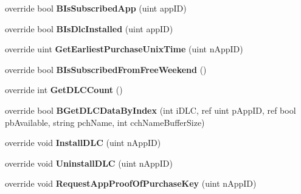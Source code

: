 \begin{DoxyCompactItemize}
override bool {\bfseries B\+Is\+Subscribed\+App} (uint app\+ID)
\item 
\mbox{\label{class_valve_1_1_steamworks_1_1_c_steam_apps_af059435f5861d3e39b48dd1df92a7dae}} 
override bool {\bfseries B\+Is\+Dlc\+Installed} (uint app\+ID)
\item 
\mbox{\label{class_valve_1_1_steamworks_1_1_c_steam_apps_aab74611945daf6679d917c1252a4f79c}} 
override uint {\bfseries Get\+Earliest\+Purchase\+Unix\+Time} (uint n\+App\+ID)
\item 
\mbox{\label{class_valve_1_1_steamworks_1_1_c_steam_apps_ab711fe1a3403481fd90bb4f454ececd7}} 
override bool {\bfseries B\+Is\+Subscribed\+From\+Free\+Weekend} ()
\item 
\mbox{\label{class_valve_1_1_steamworks_1_1_c_steam_apps_a39784a30272b3d4a9d72b33caaabf5cb}} 
override int {\bfseries Get\+D\+L\+C\+Count} ()
\item 
\mbox{\label{class_valve_1_1_steamworks_1_1_c_steam_apps_a494d578bcab8137166d976d7a9c9f043}} 
override bool {\bfseries B\+Get\+D\+L\+C\+Data\+By\+Index} (int i\+D\+LC, ref uint p\+App\+ID, ref bool pb\+Available, string pch\+Name, int cch\+Name\+Buffer\+Size)
\item 
\mbox{\label{class_valve_1_1_steamworks_1_1_c_steam_apps_a43f23607ebeff947c539bf0337e3cb9e}} 
override void {\bfseries Install\+D\+LC} (uint n\+App\+ID)
\item 
\mbox{\label{class_valve_1_1_steamworks_1_1_c_steam_apps_a14885a36c953bdfa6f941e2dee7131bb}} 
override void {\bfseries Uninstall\+D\+LC} (uint n\+App\+ID)
\item 
\mbox{\label{class_valve_1_1_steamworks_1_1_c_steam_apps_ae3ce445d7f09201dd92ee5a3d785d027}} 
override void {\bfseries Request\+App\+Proof\+Of\+Purchase\+Key} (uint n\+App\+ID)
\item 
\mbox{\label{class_valve_1_1_steamworks_1_1_c_steam_apps_ab6540df09823d12db6a90112ff2cbdd1}} 

\end{DoxyCompactItemize}
